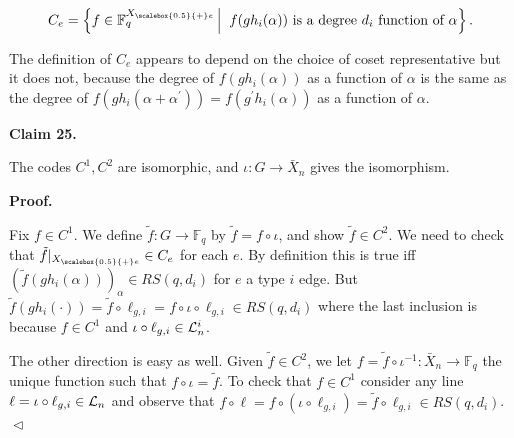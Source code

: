 \documentclass[10pt,a4paper]{article}
\begin{document}
\[\begin{gathered}
C_{e}=\left\{f\in\mathbb{F}_{q}^{{X}_{\scalebox{0.5}{+}e}}\left|\;\vphantom{f\in\mathbb{F}_{q}^{{X}_{\scalebox{0.5}{+}e}}f(gh_{i}(\alpha))\hbox{ is a degree }d_{i}\hbox{ function of }\alpha}\right.f(gh_{i}(\alpha))\hbox{ is a degree }d_{i}\hbox{ function of }\alpha\right\}.
\end{gathered}\]


The definition of $C_{e}$ appears to depend on the choice of coset representative but it does not, because the degree of $f(gh_{i}(\alpha))$ as a function of $\alpha$ is the same as the degree of $f(gh_{i}(\alpha+\alpha^{\prime}))=f(g^{\prime}h_{i}(\alpha))$ as a function of $\alpha$.\par





\par\medskip\noindent\textbf{
Claim 25. 
}\par



The codes $C^{1},C^{2}$ are isomorphic, and $\iota:G\to\bar{X}_{n}$ gives the isomorphism.\par






\par\medskip\noindent\textbf{
\textbf{Proof}.}\par




Fix $f\in C^{1}$. We define $\tilde{f}:G\to\mathbb{F}_{q}$ by $\tilde{f}=f\circ\iota$, and show $\tilde{f}\in C^{2}$.
We need to check that $\tilde{f}|_{{X}_{\scalebox{0.5}{+}e}}\in C_{e}$ for each $e$.
By definition this is true iff $(\tilde{f}(gh_{i}(\alpha)))_{\alpha}\in RS(q,d_{i})$ for $e$ a type $i$ edge. But $\tilde{f}(gh_{i}(\cdot))=\tilde{f}\circ\ell_{g,i}=f\circ\iota\circ\ell_{g,i}\in RS(q,d_{i})$ where the last inclusion is because $f\in C^{1}$ and $\iota\circ\ell_{g,i}\in{\cal L}_{n}^{i}$.\par




The other direction is easy as well. Given $\tilde{f}\in C^{2}$, we let $f=\tilde{f}\circ\iota^{-1}:\bar{X}_{n}\to\mathbb{F}_{q}$ the unique function such that $f\circ\iota=\tilde{f}$. To check that $f\in C^{1}$ consider any line $\ell=\iota\circ\ell_{g,i}\in{\cal L}_{n}$ and observe that $f\circ\ell=f\circ(\iota\circ\ell_{g,i})=\tilde{f}\circ\ell_{g,i}\in RS(q,d_{i})$.
$\vartriangleleft$\par
\end{document}
